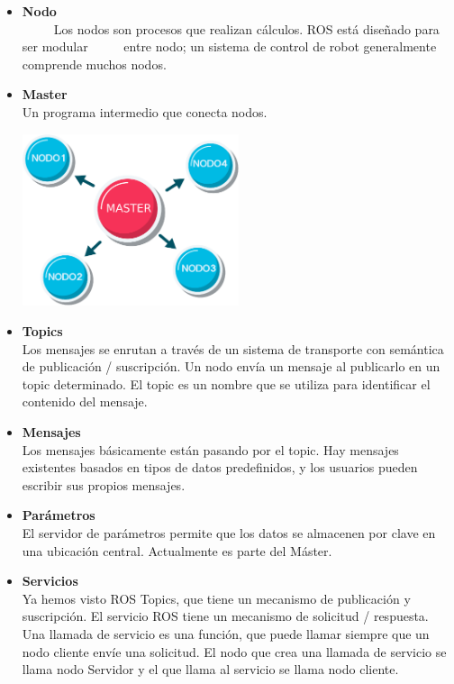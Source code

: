 \begin{itemize}
	\item \textbf{Nodo}\\
	      Los nodos son procesos que realizan cálculos. ROS está diseñado para ser modular
	      entre nodo; un sistema de control de robot generalmente comprende muchos nodos.	
	\item \textbf{Master}\\
	      Un programa intermedio que conecta nodos.
	      \begin{center}
		      \includegraphics[width=0.5\textwidth]{Contenido/Cuerpo/Capitulo2/Fig2.eps}
		      \label{fig:MarcoTeorico:Fig14}
	      \end{center}
	\item \textbf{Topics}\\
	      Los mensajes se enrutan a través de un sistema de transporte con semántica de
	      publicación / suscripción. Un nodo envía un mensaje al publicarlo en un topic
	      determinado. El topic es un nombre que se utiliza para identificar el contenido del
	      mensaje.
	\item \textbf{Mensajes}\\
	      Los mensajes básicamente están pasando por el topic. Hay mensajes existentes
	      basados en tipos de datos predefinidos, y los usuarios pueden escribir sus
	      propios mensajes.
	\item \textbf{Parámetros}\\
	      El servidor de parámetros permite que los datos se almacenen por clave en una
	      ubicación central. Actualmente es parte del Máster.
	\item \textbf{Servicios}\\
	      Ya hemos visto ROS Topics, que tiene un mecanismo de publicación y suscripción.
	      El servicio ROS tiene un mecanismo de solicitud / respuesta. Una llamada de
	      servicio es una función, que puede llamar siempre que un nodo cliente envíe una
	      solicitud. El nodo que crea una llamada de servicio se llama nodo Servidor y el
	      que llama al servicio se llama nodo cliente.\cite{Book:Lentin2018}

\end{itemize}

